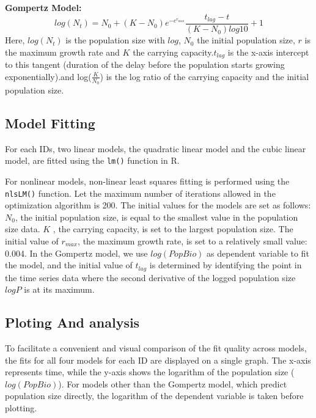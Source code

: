 \documentclass[11pt]{article}
\begin{document}
\textbf{Gompertz Model:}
\[ log(N_{t}) = N_{0} + (K - N_{0})e^{-e^{r_{\max}}} \frac{t_{lag} - t}{(K - N_{0})log{10}}+1 \]
Here, $log(N_t)$ is the population size with $log$, $N_0$  the initial population size, $r$ is the maximum growth rate and $K$ the carrying capacity.$t_{lag}$ is the x-axis intercept to this tangent (duration of the delay before the population starts growing exponentially).and log($\frac{K}{N_{0}}$) is the log ratio of the carrying capacity and the initial population size.

\subsection{Model Fitting}

For each IDs, two linear models, the quadratic linear model and the cubic linear model, are fitted using the \texttt{lm()} function in R.

For nonlinear models, non-linear least squares fitting is performed using the \texttt{nlsLM()} function. Let the maximum number of iterations allowed in the optimization algorithm is 200. The initial values for the models are set as follows: $N_0$, the initial population size, is equal to the smallest value in the population size data. $K$ , the carrying capacity, is set to the largest population size. The initial value of $r_{max}$, the maximum growth rate, is set to a relatively small value: 0.004. 
In the Gompertz model, we use $log(PopBio)$ as dependent variable to fit the model, and the initial value of $t_{lag}$ is determined by identifying the point in the time series data where the second derivative of the logged population size $logP$ is at its maximum.
\subsection{Ploting And analysis}

To facilitate a convenient and visual comparison of the fit quality across models, the fits for all four models for each ID are displayed on a single graph. The x-axis represents time, while the y-axis shows the logarithm of the population size ($log(PopBio)$). For models other than the Gompertz model, which predict population size directly, the logarithm of the dependent variable is taken before plotting.
\end{document}
